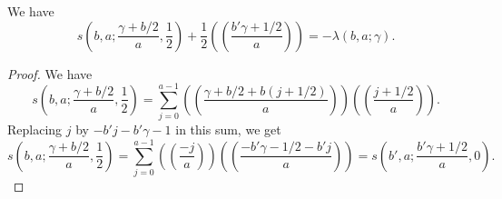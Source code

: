 \documentclass[10pt,a4paper]{amsart}
\begin{document}
\begin{lemma}\label{lem:slambda}
We have
\[
s\left(b,a; \frac{\gamma + b/2}{a} , \frac{1}{2}\right) + \frac{1}{2}\left( \! \left( \frac{b'\gamma + 1/2}{a} \right) \! \right) = -\lambda(b,a;\gamma).
\]
\end{lemma}

\begin{proof}
We have
\[
s\left(b,a ; \frac{\gamma + b/2}{a} , \frac{1}{2} \right) = \sum_{j=0}^{a-1} \left( \! \left( \frac{ \gamma + b/2 + b(j+1/2) }{a} \right) \! \right) \left( \! \left( \frac{j + 1/2}{a} \right) \! \right).
\]
Replacing $j$ by $-b'j - b'\gamma -1$ in this sum, we get
\[
s\left(b,a ; \frac{\gamma + b/2}{a} , \frac{1}{2} \right) = \sum_{j=0}^{a-1} \left( \! \left( \frac{ -j }{a} \right) \! \right) \left( \! \left( \frac{-b'\gamma - 1/2 - b'j}{a} \right) \! \right) = s\left( b' , a ; \frac{b'\gamma + 1/2}{a} , 0 \right).
\]


\end{proof}
\end{document}
